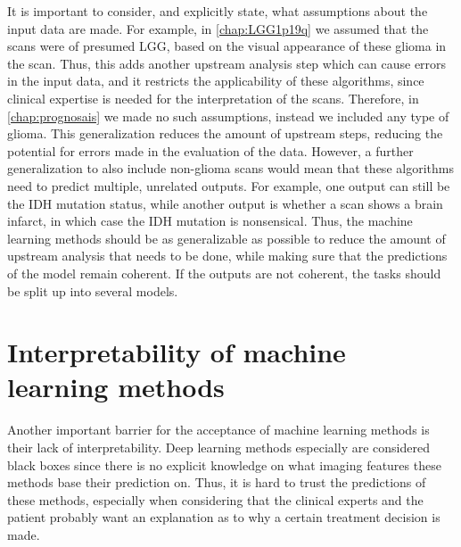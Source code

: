 It is important to consider, and explicitly state, what assumptions about the input data are made.
For example, in \cref{chap:LGG1p19q} we assumed that the scans were of presumed \gls{LGG}, based on the visual appearance of these glioma in the scan.
Thus, this adds another upstream analysis step which can cause errors in the input data, and it restricts the applicability of these algorithms, since clinical expertise is needed for the interpretation of the scans.
Therefore, in \cref{chap:prognosais} we made no such assumptions, instead we included any type of glioma.
This generalization reduces the amount of upstream steps, reducing the potential for errors made in the evaluation of the data.
However, a further generalization to also include non-glioma scans would mean that these algorithms need to predict multiple, unrelated outputs.
For example, one output can still be the \gls{IDH} mutation status, while another output is whether a scan shows a brain infarct, in which case the \gls{IDH} mutation is nonsensical.
Thus, the machine learning methods should be as generalizable as possible to reduce the amount of upstream analysis that needs to be done, while making sure that the predictions of the model remain coherent.
If the outputs are not coherent, the tasks should be split up into several models.


\section{Interpretability of machine learning methods}

Another important barrier for the acceptance of machine learning methods is their lack of interpretability.
Deep learning methods especially are considered black boxes since there is no explicit knowledge on what imaging features these methods base their prediction on.
Thus, it is hard to trust the predictions of these methods, especially when considering that the clinical experts and the patient probably want an explanation as to why a certain treatment decision is made.

